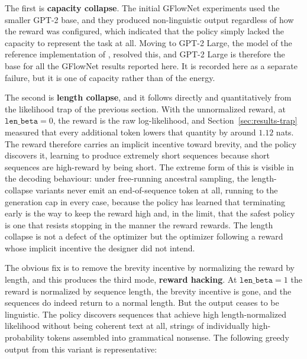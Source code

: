 The first is \textbf{capacity collapse}. The initial GFlowNet experiments used the smaller GPT-2 base, and they produced non-linguistic output regardless of how the reward was configured, which indicated that the policy simply lacked the capacity to represent the task at all. Moving to GPT-2 Large, the model of the reference implementation of \citet{hu2024amortizing}, resolved this, and GPT-2 Large is therefore the base for all the GFlowNet results reported here. It is recorded here as a separate failure, but it is one of capacity rather than of the energy.

The second is \textbf{length collapse}, and it follows directly and quantitatively from the likelihood trap of the previous section. With the unnormalized reward, at $\texttt{len\_beta}=0$, the reward is the raw log-likelihood, and Section~\ref{sec:results-trap} measured that every additional token lowers that quantity by around $1.12$ nats. The reward therefore carries an implicit incentive toward brevity, and the policy discovers it, learning to produce extremely short sequences because short sequences are high-reward by being short.
The extreme form of this is visible in the decoding behaviour: under free-running ancestral sampling, the length-collapse variants never emit an end-of-sequence token at all, running to the generation cap in every case, because the policy has learned that terminating early is the way to keep the reward high and, in the limit, that the safest policy is one that resists stopping in the manner the reward rewards.
The length collapse is not a defect of the optimizer but the optimizer following a reward whose implicit incentive the designer did not intend.

The obvious fix is to remove the brevity incentive by normalizing the reward by length, and this produces the third mode, \textbf{reward hacking}. At $\texttt{len\_beta}=1$ the reward is normalized by sequence length, the brevity incentive is gone, and the sequences do indeed return to a normal length. But the output ceases to be linguistic. The policy discovers sequences that achieve high length-normalized likelihood without being coherent text at all, strings of individually high-probability tokens assembled into grammatical nonsense. The following greedy output from this variant is representative:

